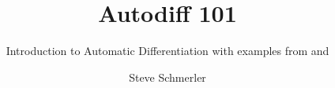 \documentclass[fleqn,10pt]{beamer}
\title{Autodiff 101}
\subtitle{Introduction to Automatic Differentiation with examples from \jax and \pytorch}
\author{Steve Schmerler}
\institute{HZDR/Helmholtz AI}
\date{}
\begin{document}
\newcommand{\edgecol}{
    \begin{equation*}
        \ve f: \mathbb R \ra \mathbb R^m\quad \ma J
        = \pd{\ve f}{x} =
        \begin{bmatrix}
            \pd{f_1}{x_1}  \\
            \vdots         \\
            \pd{f_m}{x_1}
        \end{bmatrix}
        = \ma J[:,1]\in\mathbb R^{m\times 1}
    \end{equation*}
}

\newcommand{\edgerow}{
    \begin{equation*}
        f: \mathbb R^n \ra \mathbb R\quad \ma J
        = \pd{f}{\ve x} =
        \begin{bmatrix}
            \pd{f_1}{x_1} & \cdots & \pd{f_1}{x_n}
        \end{bmatrix} \equiv \nabla f
        = \ma J[1,:] \in\mathbb R^{1\times n}
    \end{equation*}
}


\begin{frame}
    \titlepage
\end{frame}
\end{document}
